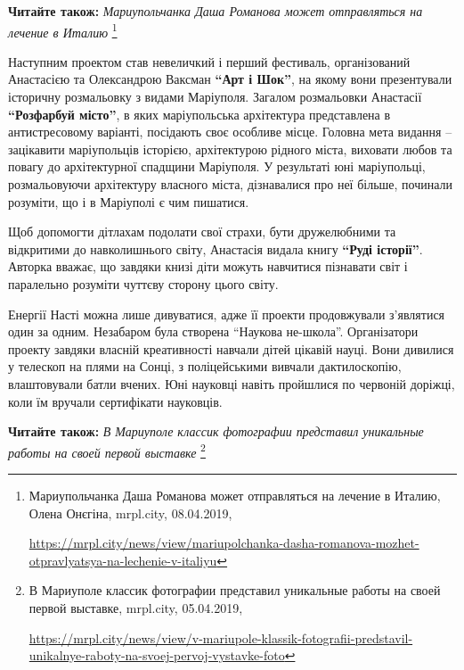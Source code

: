 \textbf{Читайте також:} \emph{Мариупольчанка Даша Романова может отправляться на лечение в Италию}%
\footnote{Мариупольчанка Даша Романова может отправляться на лечение в Италию, Олена Онєгіна, mrpl.city, 08.04.2019, \par%
\url{https://mrpl.city/news/view/mariupolchanka-dasha-romanova-mozhet-otpravlyatsya-na-lechenie-v-italiyu}
}

Наступним проектом став невеличкий і перший фестиваль, організований Анастасією
та Олександрою Ваксман \textbf{\enquote{Арт і Шок}}, на якому вони презентували історичну
розмальовку з видами Маріуполя. Загалом розмальовки Анастасії \textbf{\enquote{Розфарбуй
місто}}, в яких маріупольська архітектура представлена в антистресовому
варіанті, посідають своє особливе місце. Головна мета видання – зацікавити
маріупольців історією, архітектурою рідного міста, виховати любов та повагу до
архітектурної спадщини Маріуполя. У результаті юні маріупольці, розмальовуючи
архітектуру власного міста, дізнавалися про неї більше, починали розуміти, що і
в Маріуполі є чим пишатися.


Щоб допомогти дітлахам подолати свої страхи, бути дружелюбними та відкритими до
навколишнього світу, Анастасія видала книгу \textbf{\enquote{Руді історії}}. Авторка вважає, що
завдяки книзі діти можуть навчитися пізнавати світ і паралельно розуміти
чуттєву сторону цього світу.

Енергії Насті можна лише дивуватися, адже її проекти продовжували з'являтися
один за одним. Незабаром була створена \enquote{Наукова не-школа}. Організатори проекту
завдяки власній креативності навчали дітей цікавій науці. Вони дивилися у
телескоп на плями на Сонці, з поліцейськими вивчали дактилоскопію, влаштовували
батли вчених. Юні науковці навіть пройшлися по червоній доріжці, коли їм
вручали сертифікати науковців.

\textbf{Читайте також:} \emph{В Мариуполе классик фотографии представил уникальные работы на своей первой выставке}%
\footnote{В Мариуполе классик фотографии представил уникальные работы на своей первой выставке, mrpl.city, 05.04.2019, \par%
\url{https://mrpl.city/news/view/v-mariupole-klassik-fotografii-predstavil-unikalnye-raboty-na-svoej-pervoj-vystavke-foto}
}

